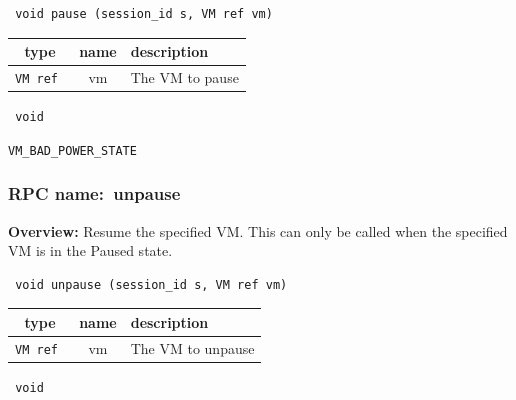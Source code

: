 \begin{verbatim} void pause (session_id s, VM ref vm)\end{verbatim}



 
\vspace{0.3cm}
\begin{tabular}{|c|c|p{7cm}|}
 \hline
{\bf type} & {\bf name} & {\bf description} \\ \hline
{\tt VM ref } & vm & The VM to pause \\ \hline 

\end{tabular}

\vspace{0.3cm}

{\tt 
void
}



\vspace{0.3cm}

 {\tt VM\_BAD\_POWER\_STATE}

\vspace{0.6cm}
\subsubsection{RPC name:~unpause}

{\bf Overview:} 
Resume the specified VM. This can only be called when the specified VM is
in the Paused state.

\begin{verbatim} void unpause (session_id s, VM ref vm)\end{verbatim}



 
\vspace{0.3cm}
\begin{tabular}{|c|c|p{7cm}|}
 \hline
{\bf type} & {\bf name} & {\bf description} \\ \hline
{\tt VM ref } & vm & The VM to unpause \\ \hline 

\end{tabular}

\vspace{0.3cm}

{\tt 
void
}



\vspace{0.3cm}

